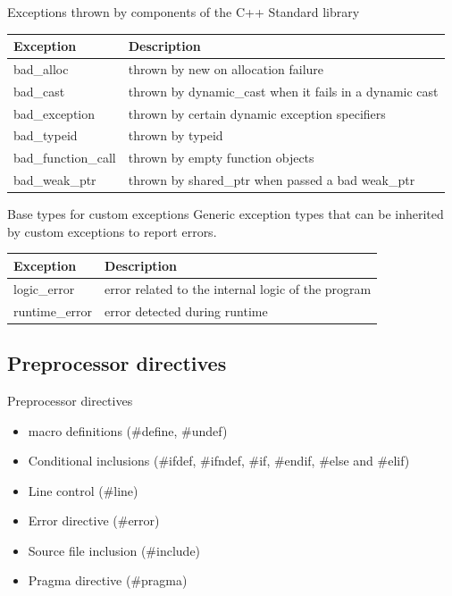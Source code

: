 \documentclass{beamer}
\begin{document}
\begin{frame}{Exceptions thrown by components of the C++ Standard library}
\begin{table}
\begin{tabular}{l | l }
Exception & Description \\
\hline
bad\_alloc & thrown by new on allocation failure \\
bad\_cast & thrown by dynamic\_cast when it fails in a dynamic cast \\
bad\_exception & thrown by certain dynamic exception specifiers \\
bad\_typeid & thrown by typeid \\
bad\_function\_call & thrown by empty function objects \\
bad\_weak\_ptr & thrown by shared\_ptr when passed a bad weak\_ptr
\end{tabular}
\end{table}
\end{frame}

\begin{frame}{Base types for custom exceptions}
Generic exception types that can be inherited by custom exceptions to report
errors.
\begin{table}
\begin{tabular}{l | l }
Exception & Description \\
\hline
logic\_error & error related to the internal logic of the program \\
runtime\_error & error detected during runtime
\end{tabular}
\end{table}
\end{frame}

\subsection{Preprocessor directives}
\begin{frame}{Preprocessor directives}
\begin{itemize}
  \item macro definitions (\#define, \#undef)
  \item Conditional inclusions (\#ifdef, \#ifndef, \#if, \#endif, \#else and \#elif)
  \item Line control (\#line)
  \item Error directive (\#error)
  \item Source file inclusion (\#include)
  \item Pragma directive (\#pragma)
\end{itemize}
\end{frame}
\end{document}
